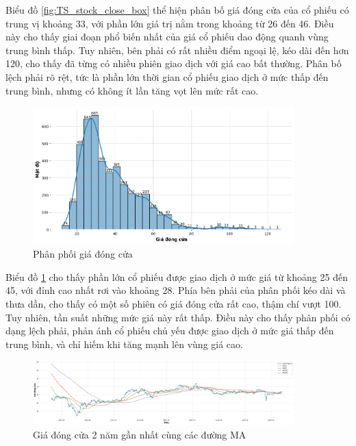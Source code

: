    Biểu đồ \ref{fig:TS_stock_close_box} thể hiện phân bố giá đóng cửa của cổ phiếu có trung vị khoảng 33, với phần lớn giá trị nằm trong khoảng từ 26 đến 46. Điều này cho thấy giai đoạn phổ biến nhất của giá cổ phiếu dao động quanh vùng trung bình thấp. Tuy nhiên, bên phải có rất nhiều điểm ngoại lệ, kéo dài đến hơn 120, cho thấy đã từng có nhiều phiên giao dịch với giá cao bất thường. Phân bố lệch phải rõ rệt, tức là phần lớn thời gian cổ phiếu giao dịch ở mức thấp đến trung bình, nhưng có không ít lần tăng vọt lên mức rất cao.

    \begin{figure}[htp]
        \centering
        \includegraphics[width=0.90\textwidth]{images/TS_stock_close_hist.png}
        \caption{Phân phối giá đóng cửa}
        \label{fig:TS_stock_close_hist}
    \end{figure}
    \FloatBarrier

    Biểu đồ  \ref{fig:TS_stock_close_hist} cho thấy phần lớn cổ phiếu được giao dịch ở mức giá từ khoảng 25 đến 45, với đỉnh cao nhất rơi vào khoảng 28. Phía bên phải của phân phối kéo dài và thưa dần, cho thấy có một số phiên có giá đóng cửa rất cao, thậm chí vượt 100. Tuy nhiên, tần suất những mức giá này rất thấp. Điều này cho thấy phân phối có dạng lệch phải, phản ánh cổ phiếu chủ yếu được giao dịch ở mức giá thấp đến trung bình, và chỉ hiếm khi tăng mạnh lên vùng giá cao.

    \begin{figure}[htp]
        \centering
        \includegraphics[width=0.90\textwidth]{images/TS_stock_close_MA.png}
        \caption{Giá đóng cửa 2 năm gần nhất cùng các đường MA}
        \label{fig:TS_stock_close_MA}
    \end{figure}
    \FloatBarrier

